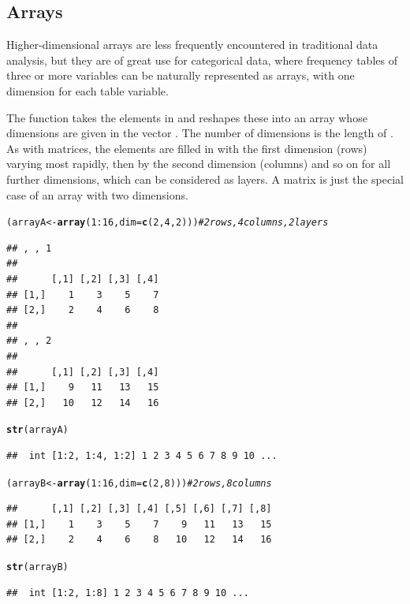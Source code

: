 \documentclass[11pt]{book}\usepackage[]{graphicx}\usepackage[]{color}
\makeatletter
\newcommand{\hlnum}[1]{\textcolor[rgb]{0.686,0.059,0.569}{#1}}%
\newcommand{\hlcom}[1]{\textcolor[rgb]{0.678,0.584,0.686}{\textit{#1}}}%
\newcommand{\hlopt}[1]{\textcolor[rgb]{0,0,0}{#1}}%
\newcommand{\hlstd}[1]{\textcolor[rgb]{0.345,0.345,0.345}{#1}}%
\newcommand{\hlkwb}[1]{\textcolor[rgb]{0.69,0.353,0.396}{#1}}%
\newcommand{\hlkwc}[1]{\textcolor[rgb]{0.333,0.667,0.333}{#1}}%
\newcommand{\hlkwd}[1]{\textcolor[rgb]{0.737,0.353,0.396}{\textbf{#1}}}%
\newenvironment{kframe}{%
 \def\at@end@of@kframe{}%
 \ifinner\ifhmode%
  \def\at@end@of@kframe{\end{minipage}}%
  \begin{minipage}{\columnwidth}%
 \fi\fi%
 \def\FrameCommand##1{\hskip\@totalleftmargin \hskip-\fboxsep
 \colorbox{shadecolor}{##1}\hskip-\fboxsep
     \hskip-\linewidth \hskip-\@totalleftmargin \hskip\columnwidth}%
 \MakeFramed {\advance\hsize-\width
   \@totalleftmargin\z@ \linewidth\hsize
   \@setminipage}}%
 {\par\unskip\endMakeFramed%
 \at@end@of@kframe}
\newenvironment{knitrout}{}{} %
\renewenvironment{knitrout}{\small\renewcommand{\baselinestretch}{.85}}{} %
\makeatother
\begin{document}
\subsection{Arrays}
Higher-dimensional arrays are less frequently encountered in traditional data analysis,
but they are of great use for categorical data, where frequency tables of three or more
variables can be naturally represented as arrays, with one dimension for each
table variable.

The function  takes the elements in  and
reshapes these into an array whose dimensions are given in the vector .
The number of dimensions is the length of .  As with matrices, the
elements are filled in with the first dimension (rows) varying most rapidly,
then by the second dimension (columns) and so on for all further dimensions,
which can be considered as layers.
A matrix is just the special case of an array with two dimensions.

\begin{knitrout}
\color{fgcolor}\begin{kframe}
\begin{alltt}
\hlstd{(arrayA} \hlkwb{<-} \hlkwd{array}\hlstd{(}\hlnum{1}\hlopt{:}\hlnum{16}\hlstd{,} \hlkwc{dim}\hlstd{=}\hlkwd{c}\hlstd{(}\hlnum{2}\hlstd{,} \hlnum{4}\hlstd{,} \hlnum{2}\hlstd{)))}     \hlcom{# 2 rows, 4 columns, 2 layers}
\end{alltt}
\begin{verbatim}
## , , 1
## 
##      [,1] [,2] [,3] [,4]
## [1,]    1    3    5    7
## [2,]    2    4    6    8
## 
## , , 2
## 
##      [,1] [,2] [,3] [,4]
## [1,]    9   11   13   15
## [2,]   10   12   14   16
\end{verbatim}
\begin{alltt}
\hlkwd{str}\hlstd{(arrayA)}
\end{alltt}
\begin{verbatim}
##  int [1:2, 1:4, 1:2] 1 2 3 4 5 6 7 8 9 10 ...
\end{verbatim}
\begin{alltt}
\hlstd{(arrayB} \hlkwb{<-} \hlkwd{array}\hlstd{(}\hlnum{1}\hlopt{:}\hlnum{16}\hlstd{,} \hlkwc{dim}\hlstd{=}\hlkwd{c}\hlstd{(}\hlnum{2}\hlstd{,} \hlnum{8}\hlstd{)))}        \hlcom{# 2 rows, 8 columns}
\end{alltt}
\begin{verbatim}
##      [,1] [,2] [,3] [,4] [,5] [,6] [,7] [,8]
## [1,]    1    3    5    7    9   11   13   15
## [2,]    2    4    6    8   10   12   14   16
\end{verbatim}
\begin{alltt}
\hlkwd{str}\hlstd{(arrayB)}
\end{alltt}
\begin{verbatim}
##  int [1:2, 1:8] 1 2 3 4 5 6 7 8 9 10 ...
\end{verbatim}
\end{kframe}
\end{knitrout}
\end{document}
